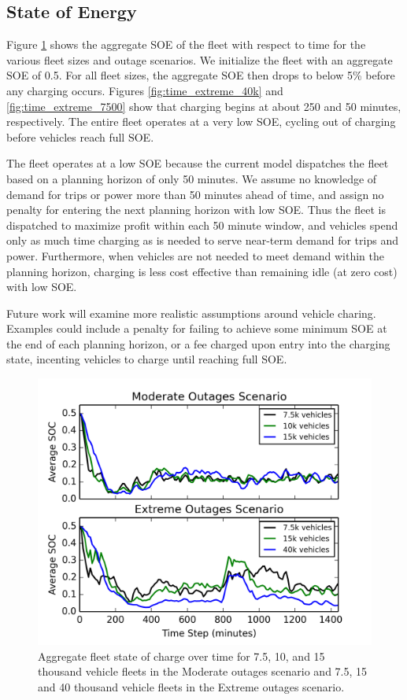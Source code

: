 \documentclass[journal]{IEEEtran}
\begin{document}
\subsection{State of Energy}
Figure \ref{fig:soe} shows the aggregate SOE of the fleet with respect to time for the various fleet sizes and outage scenarios. We initialize the fleet with an aggregate SOE of 0.5. For all fleet sizes, the aggregate SOE then drops to below 5\% before any charging occurs. Figures \ref{fig:time_extreme_40k} and \ref{fig:time_extreme_7500} show that charging begins at about 250 and 50 minutes, respectively. The entire fleet operates at a very low SOE, cycling out of charging before vehicles reach full SOE. 

The fleet operates at a low SOE because the current model dispatches the fleet based on a planning horizon of only 50 minutes. We assume no knowledge of demand for trips or power more than 50 minutes ahead of time, and assign no penalty for entering the next planning horizon with low SOE. Thus the fleet is dispatched to maximize profit within each 50 minute window, and vehicles spend only as much time charging as is needed to serve near-term demand for trips and power. Furthermore, when vehicles are not needed to meet demand within the planning horizon, charging is less cost effective than remaining idle (at zero cost) with low SOE.

Future work will examine more realistic assumptions around vehicle charing. Examples could include a penalty for failing to achieve some minimum SOE at the end of each planning horizon, or a fee charged upon entry into the charging state, incenting vehicles to charge until reaching full SOE.

\begin{figure}[!htbp]
  \includegraphics[width=\linewidth]{plots/soc_v_time.png}
  \caption{Aggregate fleet state of charge over time for 7.5, 10, and 15 thousand vehicle fleets in the Moderate outages scenario and 7.5, 15 and 40 thousand vehicle fleets in the Extreme outages scenario.}
  \label{fig:soe}
\end{figure}
\end{document}
